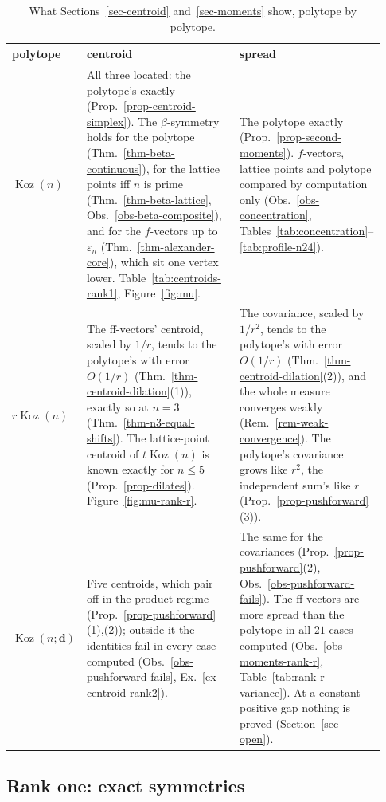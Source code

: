 \documentclass[11pt, a4paper, abstract=yes]{scrartcl}
\theoremstyle{definition}
\theoremstyle{remark}
\theoremstyle{plain}
\newcommand{\vek}[1]{\boldsymbol{#1}}
\theoremstyle{remark}
\theoremstyle{plain}
\newcommand{\Koz}{\operatorname{Koz}}
\begin{document}
\begin{table}[tbp]
\centering\footnotesize
\renewcommand{\arraystretch}{1.15}
\begin{tabular}{@{}p{0.12\linewidth}p{0.42\linewidth}p{0.39\linewidth}@{}}
\toprule
polytope & centroid & spread\\
\midrule
\(\Koz(n)\)
& \raggedright All three located: the polytope's exactly (Prop.~\ref{prop-centroid-simplex}). The
  \(\beta\)-symmetry holds for the polytope (Thm.~\ref{thm-beta-continuous}), for the lattice points
  iff \(n\) is prime (Thm.~\ref{thm-beta-lattice}, Obs.~\ref{obs-beta-composite}), and for the
  \(f\)-vectors up to \(\varepsilon_n\) (Thm.~\ref{thm-alexander-core}), which sit one vertex lower.
  Table~\ref{tab:centroids-rank1}, Figure~\ref{fig:mu}.
& \raggedright The polytope exactly (Prop.~\ref{prop-second-moments}). \(f\)-vectors, lattice points and polytope
  compared by computation only (Obs.~\ref{obs-concentration},
  Tables~\ref{tab:concentration}--\ref{tab:profile-n24}).\tabularnewline[3pt]
\(r\Koz(n)\)
&\raggedright The ff-vectors' centroid, scaled by \(1/r\), tends to the polytope's with error \(O(1/r)\)
  (Thm.~\ref{thm-centroid-dilation}(1)), exactly so at \(n=3\) (Thm.~\ref{thm-n3-equal-shifts}). The
  lattice-point centroid of \(t\Koz(n)\) is known exactly for \(n\le5\) (Prop.~\ref{prop-dilates}).
  Figure~\ref{fig:mu-rank-r}.
& \raggedright The covariance, scaled by \(1/r^2\), tends to the polytope's with error \(O(1/r)\)
  (Thm.~\ref{thm-centroid-dilation}(2)), and the whole measure converges weakly
  (Rem.~\ref{rem-weak-convergence}). The polytope's covariance grows like \(r^2\), the independent
  sum's like \(r\) (Prop.~\ref{prop-pushforward}(3)).\tabularnewline[3pt]
\(\Koz(n;\vek d)\)
& \raggedright Five centroids, which pair off in the product regime (Prop.~\ref{prop-pushforward}(1),(2));
  outside it the identities fail in every case computed (Obs.~\ref{obs-pushforward-fails},
  Ex.~\ref{ex-centroid-rank2}).
& \raggedright The same for the covariances (Prop.~\ref{prop-pushforward}(2), Obs.~\ref{obs-pushforward-fails}).
  The ff-vectors are more spread than the polytope in all \(21\) cases computed
  (Obs.~\ref{obs-moments-rank-r}, Table~\ref{tab:rank-r-variance}). At a constant positive gap
  nothing is proved (Section~\ref{sec-open}).\tabularnewline
\bottomrule
\end{tabular}
\caption{What Sections~\ref{sec-centroid} and~\ref{sec-moments} show, polytope by polytope.}
\label{tab:centroid-summary}
\end{table}
\subsection{Rank one: exact symmetries}
\label{sec:orgc8aebf0}
\end{document}
